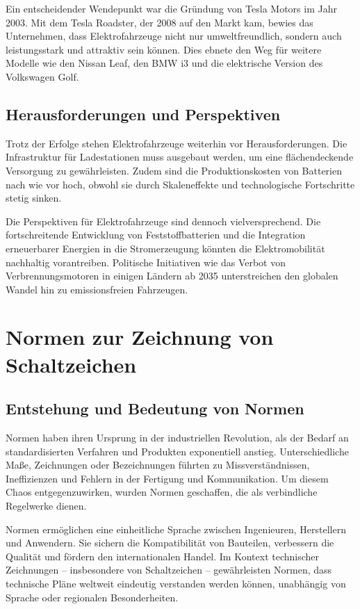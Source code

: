Ein entscheidender Wendepunkt war die Gründung von Tesla Motors im Jahr 2003. Mit dem Tesla Roadster, der 2008 auf den Markt kam, bewies das Unternehmen, dass Elektrofahrzeuge nicht nur umweltfreundlich, sondern auch leistungsstark und attraktiv sein können. Dies ebnete den Weg für weitere Modelle wie den Nissan Leaf, den BMW i3 und die elektrische Version des Volkswagen Golf.

\subsection*{Herausforderungen und Perspektiven}
Trotz der Erfolge stehen Elektrofahrzeuge weiterhin vor Herausforderungen. Die Infrastruktur für Ladestationen muss ausgebaut werden, um eine flächendeckende Versorgung zu gewährleisten. Zudem sind die Produktionskosten von Batterien nach wie vor hoch, obwohl sie durch Skaleneffekte und technologische Fortschritte stetig sinken.

Die Perspektiven für Elektrofahrzeuge sind dennoch vielversprechend. Die fortschreitende Entwicklung von Feststoffbatterien und die Integration erneuerbarer Energien in die Stromerzeugung könnten die Elektromobilität nachhaltig vorantreiben. Politische Initiativen wie das Verbot von Verbrennungsmotoren in einigen Ländern ab 2035 unterstreichen den globalen Wandel hin zu emissionsfreien Fahrzeugen.
\section{Normen zur Zeichnung von Schaltzeichen}

\subsection*{Entstehung und Bedeutung von Normen}
Normen haben ihren Ursprung in der industriellen Revolution, als der Bedarf an standardisierten Verfahren und Produkten exponentiell anstieg. Unterschiedliche Maße, Zeichnungen oder Bezeichnungen führten zu Missverständnissen, Ineffizienzen und Fehlern in der Fertigung und Kommunikation. Um diesem Chaos entgegenzuwirken, wurden Normen geschaffen, die als verbindliche Regelwerke dienen.

Normen ermöglichen eine einheitliche Sprache zwischen Ingenieuren, Herstellern und Anwendern. Sie sichern die Kompatibilität von Bauteilen, verbessern die Qualität und fördern den internationalen Handel. Im Kontext technischer Zeichnungen – insbesondere von Schaltzeichen – gewährleisten Normen, dass technische Pläne weltweit eindeutig verstanden werden können, unabhängig von Sprache oder regionalen Besonderheiten.

